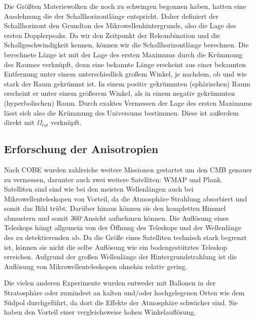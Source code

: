\documentclass[10pt,a4paper]{article}
\newcommand{\degree}{$^\circ$}
\begin{document}
Die Größten Materiewolken die noch zu schwingen begonnen haben, hatten eine Ausdehnung die der Schallhorizontlänge entspricht. Daher definiert der Schallhorizont den Grundton des Mikrowellenhintergrunds, also die Lage des ersten Dopplerpeaks. Da wir den Zeitpunkt der Rekombination und die Schallgeschwindigkeit kennen, können wir die Schallhorizontlänge berechnen. Die berechnete Länge ist mit der Lage des ersten Maximums durch die Krümmung des Raumes verknüpft, denn eine bekannte Länge erscheint aus einer bekannten Entfernung unter einem unterschiedlich großem Winkel, je nachdem, ob und wie stark der Raum gekrümmt ist. In einem positiv gekrümmten (sphärischen) Raum erscheint er unter einem größerem Winkel, als in einem negativ gekrümmten (hyperbolischen) Raum. Durch exaktes Vermessen der Lage des ersten Maximums lässt sich also die Krümmung des Universums bestimmen. Diese ist außerdem direkt mit $\Omega_{tot}$ verknüpft.\cite{S+W03} %

\subsection{Erforschung der Anisotropien}\label{Missionen}
Nach COBE wurden zahlreiche weitere Missionen gestartet um den CMB genauer zu vermessen, darunter auch zwei weitere Satelliten: WMAP und Plank.
Satelliten sind sind wie bei den meisten Wellenlängen auch bei Mikrowellenteleskopen von Vorteil, da die Atmosphäre Strahlung absorbiert und somit das Bild trübt. Darüber hinaus können sie den kompletten Himmel abmustern und somit 360\degree Ansicht aufnehmen können. Die Auflösung eines Teleskops hängt allgemein von der Öffnung des Teleskops und der Wellenlänge des zu detektierenden ab. Da die Größe eines Satelliten technisch stark begrenzt ist, können sie nicht die selbe Auflösung wie ein bodengestütztes Teleskop erreichen. Aufgrund der großen Wellenlänge der Hintergrundstrahlung ist die Auflösung von Mikrowellenteleskopen ohnehin relativ gering.

Die vielen anderen Experimente wurden entweder mit Ballonen in der Stratosphäre oder zumindest an kalten und/oder hochgelegenen Orten wie dem Südpol durchgeführt, da dort die Effekte der Atmosphäre schwächer sind. Sie haben den Vorteil einer vergleichsweise hohen Winkelauflösung.
\end{document}
